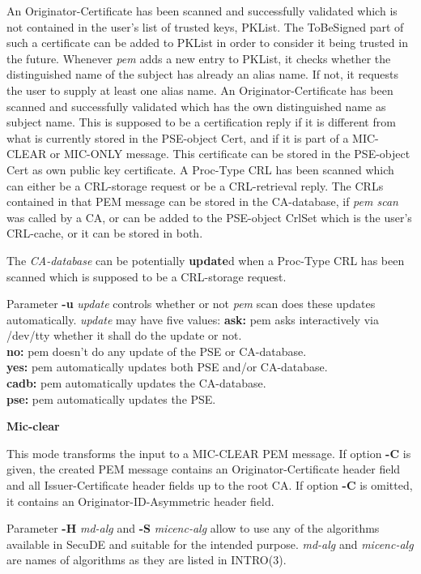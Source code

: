 \bi
\m An Originator-Certificate has been scanned and successfully validated which is not
   contained in the user's list of trusted keys, PKList. The ToBeSigned part of such
   a certificate can be added to PKList in order to consider it being trusted in the future.
   Whenever {\em pem} adds a new entry to PKList, it checks whether the distinguished
   name of the subject has already an alias name. If not, it requests the user to
   supply at least one alias name.  
\m An Originator-Certificate has been scanned and successfully validated which has the
   own distinguished name as subject name. This is supposed to be a certification reply
   if it is different from what is currently stored in the PSE-object Cert, and if it
   is part of a MIC-CLEAR or MIC-ONLY message. This certificate can be stored in the
   PSE-object Cert as own public key certificate.
\m A Proc-Type CRL has been scanned which can either be a CRL-storage request or be a
   CRL-retrieval reply. The CRLs contained in that PEM message can be stored in the CA-database,
   if {\em pem scan} was called by a CA, or can be added to the PSE-object CrlSet which is the
   user's CRL-cache, or it can be stored in both.
\ei

The {\em CA-database} can be potentially {\bf update}d when a Proc-Type CRL has been scanned
which is supposed to be a CRL-storage request.

Parameter {\bf -u} {\em update} controls whether or not {\em pem} scan does these updates automatically. 
{\em update} may have five values:
\bvtab
{\bf ask:}  \2 pem asks interactively via /dev/tty whether it shall do the update or not. \\
{\bf no:}   \2 pem doesn't do any update of the PSE or CA-database. \\
{\bf yes:}  \2 pem automatically updates both PSE and/or CA-database. \\
{\bf cadb:} \2 pem automatically updates the CA-database. \\
{\bf pse:}  \2 pem automatically updates the PSE. \\
\evtab

{\large\bf Mic-clear}

This mode transforms the input to a MIC-CLEAR PEM message. If option {\bf -C} is given, the created
PEM message contains an Originator-Certificate header field and all Issuer-Certificate header fields
up to the root CA. If option {\bf -C} is omitted, it contains an Originator-ID-Asymmetric header
field.

Parameter {\bf -H} {\em md-alg} and {\bf -S} {\em micenc-alg}
allow to use any of the algorithms available in SecuDE and suitable
for the intended purpose. {\em md-alg} and {\em micenc-alg}
are names of algorithms as they are listed in INTRO(3).

